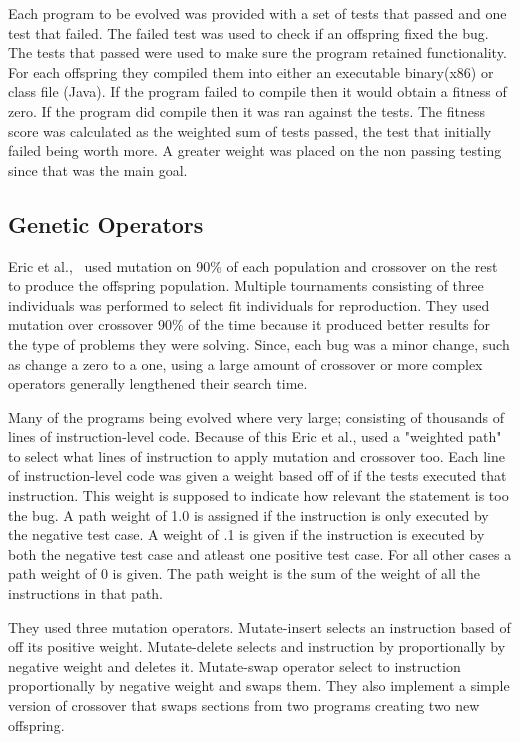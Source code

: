\documentclass{sig-alternate}
\begin{document}
Each program to be evolved was provided with a set of tests that passed and one test that failed. The failed test was used to check if an offspring fixed the bug. The tests that passed were used to make sure the program retained functionality. For each offspring they compiled them into either an executable binary(x86) or class file (Java). If the program failed to compile then it would obtain a fitness of zero. If the program did compile then it was ran against the tests. The fitness score was calculated as the weighted sum of tests passed, the test that initially failed being worth more. A greater weight was placed on the non passing testing since that was the main goal.



\subsection{Genetic Operators}
Eric et al.,~\cite{Assembly:2010} used mutation on 90\% of each population and crossover on the rest to produce the offspring population. Multiple tournaments consisting of three individuals was performed to select fit individuals for reproduction. They used mutation over crossover 90\% of the time because it produced better results for the type of problems they were solving. Since, each bug was a minor change, such as change a zero to a one, using a large amount of crossover or more complex operators generally lengthened their search time.

Many of the programs being evolved where very large; consisting of thousands of lines of instruction-level code. Because of this Eric et al., used a "weighted path" to select what lines of instruction to apply mutation and crossover too. Each line of instruction-level code was given a weight based off of if the tests executed that instruction. This weight is supposed to indicate how relevant the statement is too the bug. A path weight of 1.0 is assigned if the instruction is only executed by the negative test case. A weight of .1 is given if the instruction is executed by both the negative test case and atleast one positive test case. For all other cases a path weight of 0 is given. The path weight is the sum of the weight of all the instructions in that path. 

They used three mutation operators. Mutate-insert selects an instruction based of off its positive weight. Mutate-delete selects and instruction by proportionally by negative weight and deletes it. Mutate-swap operator select to instruction proportionally by negative weight and swaps them. They also implement a simple version of crossover that swaps sections from two programs creating two new offspring.
\end{document}
